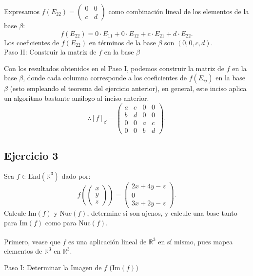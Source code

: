 \documentclass{article}
\begin{document}
   Expresamos \( f(E_{22}) = \begin{pmatrix} 0 & 0 \\ c & d \end{pmatrix} \) como combinación lineal de los elementos de la base \( \beta \):
   \[
   f(E_{22}) = 0 \cdot E_{11} + 0 \cdot E_{12} + c \cdot E_{21} + d \cdot E_{22}.
   \]
   Los coeficientes de \( f(E_{22}) \) en términos de la base \( \beta \) son \( (0, 0, c, d) \). \\

Paso II: Construir la matriz de \( f \) en la base \( \beta \)

Con los resultados obtenidos en el Paso I, podemos construir la matriz de \( f \) en la base \( \beta \), donde cada columna corresponde a los coeficientes de \( f(E_{ij}) \) en la base \( \beta \) (esto empleando el teorema del ejercicio anterior), en general, este inciso aplica un algoritmo bastante análogo al inciso anterior.
\[
\therefore [f]_\beta = \begin{pmatrix} a & c & 0 & 0 \\ b & d & 0 & 0 \\ 0 & 0 & a & c \\ 0 & 0 & b & d \end{pmatrix}.
\]

\newpage

\subsection*{Ejercicio 3}
Sea \( f \in \text{End}(\mathbb{R}^3) \) dado por:
\[
f\left( \begin{pmatrix} x \\ y \\ z \end{pmatrix} \right) = \begin{pmatrix} 2x + 4y - z \\ 0 \\ 3x + 2y - z \end{pmatrix}.
\]
Calcule \( \text{Im}(f) \) y \( \text{Nuc}(f) \), determine si son ajenos, y calcule una base tanto para \( \text{Im}(f) \) como para \( \text{Nuc}(f) \). \\\\

Primero, vease que \( f \) es una aplicación lineal de \( \mathbb{R}^3 \) en sí mismo, pues mapea elementos de $\mathbb{R}^3$ en $\mathbb{R}^3$.

Paso I: Determinar la Imagen de \( f \) (\( \text{Im}(f) \))
\end{document}
